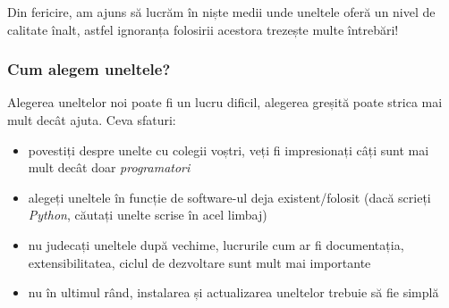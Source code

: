 \documentclass[compress]{beamer}
\begin{document}
\begin{frame}
  \begin{center}
    \huge Din fericire, am ajuns să lucrăm în niște medii unde uneltele oferă un
    nivel de calitate înalt, astfel ignoranța folosirii acestora trezește multe întrebări!
  \end{center}
\end{frame}

\begin{frame}
\frametitle{Cum alegem uneltele?}

Alegerea uneltelor noi poate fi un lucru dificil, alegerea greșită poate strica mai mult decât ajuta. Ceva sfaturi:
\begin{itemize}[<+->]
  \item povestiți despre unelte cu colegii voștri, veți fi impresionați câți sunt mai mult decât doar \emph{programatori}
  \item alegeți uneltele în funcție de software-ul deja existent/folosit (dacă scrieți \emph{Python}, căutați unelte scrise în acel limbaj)
  \item nu judecați uneltele după vechime, lucrurile cum ar fi documentația, extensibilitatea, ciclul de dezvoltare sunt mult mai importante
  \item nu în ultimul rând, instalarea și actualizarea uneltelor trebuie să fie simplă
\end{itemize}
\end{frame}
\end{document}
